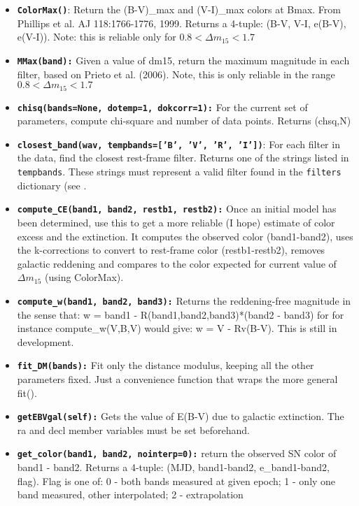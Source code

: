 \documentclass[12pt]{article}
\begin{document}
\begin{itemize}
\item \texttt{\textbf{ColorMax()}}: Return the (B-V)\_max and (V-I)\_max
colors at Bmax. From Phillips et al. AJ 118:1766-1776, 1999. Returns
a 4-tuple: (B-V, V-I, e(B-V), e(V-I)). Note: this is reliable only
for $0.8<\Delta m_{15}<1.7$
\item \texttt{\textbf{MMax(band):}} Given a value of dm15, return the maximum
magnitude in each filter, based on Prieto et al. (2006). Note, this
is only reliable in the range $0.8<\Delta m_{15}<1.7$
\item \texttt{\textbf{chisq(bands=None, dotemp=1, dokcorr=1):}} For the
current set of parameters, compute chi-square and number of data points.
Returns (chsq,N)
\item \texttt{\textbf{closest\_band(wav, tempbands={[}'B', 'V', 'R', 'I'])}}:
For each filter in the data, find the closest rest-frame filter. Returns
one of the strings listed in \texttt{tempbands}. These strings must
represent a valid filter found in the \texttt{filters} dictionary
(see .
\item \texttt{\textbf{compute\_CE(band1, band2, restb1, restb2):}} Once
an initial model has been determined, use this to get a more reliable
(I hope) estimate of color excess and the extinction. It computes
the observed color (band1-band2), uses the k-corrections to convert
to rest-frame color (restb1-restb2), removes galactic reddening and
compares to the color expected for current value of $\Delta m_{15}$
(using ColorMax). 
\item \texttt{\textbf{compute\_w(band1, band2, band3):}} Returns the reddening-free
magnitude in the sense that: w = band1 - R(band1,band2,band3){*}(band2
- band3) for for instance compute\_w(V,B,V) would give: w = V - Rv(B-V).
This is still in development.
\item \texttt{\textbf{fit\_DM(bands):}} Fit only the distance modulus, keeping
all the other parameters fixed. Just a convenience function that wraps
the more general fit().
\item \texttt{\textbf{getEBVgal(self):}} Gets the value of E(B-V) due to
galactic extinction. The ra and decl member variables must be set
beforehand. 
\item \texttt{\textbf{get\_color(band1, band2, nointerp=0):}} return the
observed SN color of band1 - band2. Returns a 4-tuple: (MJD, band1-band2,
e\_band1-band2, flag). Flag is one of: 0 - both bands measured at
given epoch; 1 - only one band measured, other interpolated; 2 - extrapolation

\end{itemize}
\end{document}
